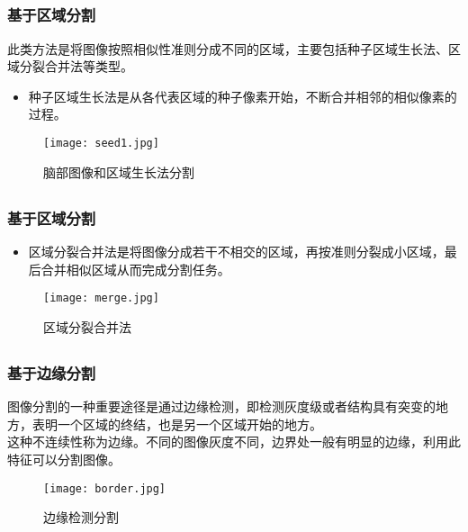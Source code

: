 \documentclass[notheorems,mathserif,table,compress]{beamer}  %
\begin{document}
\subsection{}
\begin{frame}
   \frametitle{基于区域分割}
   \hspace{0.3in}此类方法是将图像按照相似性准则分成不同的区域，主要包括种子区域生长法、区域分裂合并法等类型。\\
   \begin{itemize}
   \item 种子区域生长法是从各代表区域的种子像素开始，不断合并相邻的相似像素的过程。
   \end{itemize}
   \begin{figure}[!ht]
   \centering
   \texttt{[image: seed1.jpg]}
   \caption{脑部图像和区域生长法分割}
   \end{figure}
\end{frame}


\subsection{}
\begin{frame}
   \frametitle{基于区域分割}
   \begin{itemize}
   \item 区域分裂合并法是将图像分成若干不相交的区域，再按准则分裂成小区域，最后合并相似区域从而完成分割任务。
   \end{itemize}
   \begin{figure}[!ht]
   \centering
   \texttt{[image: merge.jpg]}
   \caption{区域分裂合并法}
   \end{figure}
\end{frame}

\subsection{}
\begin{frame}
   \frametitle{基于边缘分割}
   \hspace{0.3in}图像分割的一种重要途径是通过边缘检测，即检测灰度级或者结构具有突变的地方，表明一个区域的终结，也是另一个区域开始的地方。\\
   \hspace{0.3in}这种不连续性称为边缘。不同的图像灰度不同，边界处一般有明显的边缘，利用此特征可以分割图像。
   \begin{figure}[!ht]
   \centering
   \texttt{[image: border.jpg]}
   \caption{边缘检测分割}
   \end{figure}
\end{frame}
\end{document}
